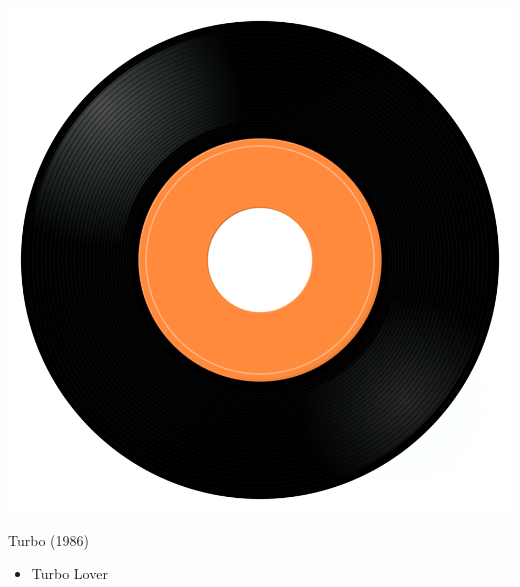 \begin{minipage}[t]{0.25\textwidth}\vspace{0pt}
	\captionsetup{type=figure}
	\includegraphics[width=\textwidth]{Images/cover.png}
	\caption*{Turbo (1986)}
\end{minipage}
\begin{minipage}[t]{0.25\textwidth}\vspace{0pt}
	\begin{itemize}[nosep,leftmargin=1em,labelwidth=*,align=left]
		\setlength{\itemsep}{0pt}
		\item Turbo Lover
	\end{itemize}
\end{minipage}
